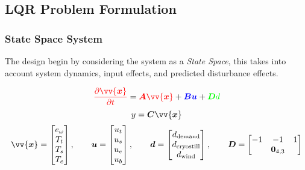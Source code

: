 \subsection{LQR Problem Formulation}
\subsubsection{State Space System}
\label{sec:lqr}

The design begin by considering the system as a \emph{State Space}, this takes into account {\color{red}system dynamics}, {\color{blue}input effects}, and predicted {\color{green}disturbance effects}.

    \begin{equation}
            {\color{red} \frac{ \partial \vv{\bm{x}} }{ \partial t } }  = {\color{red} \bm{A} \vv{\bm{x}}} + {\color{blue}\bm{B}{\bm{u}} }+ {\color{green}\bm{D} d}
    \end{equation}
        \begin{equation}
            y = \bm{C} \vv{\bm{x}}
        \end{equation}
        \begin{equation}
                \vv{\bm{x}} =
                \begin{bmatrix}
                        e_{\omega}\\
                        T_{t}\\
                        T_{s}\\
                        T_{e}\\
                \end{bmatrix}
                ,
                \qquad
                \bm{u} =
                \begin{bmatrix}
                        u_t\\
                        u_s\\
                        u_e\\
                        u_b\\
                \end{bmatrix}
                ,
                \qquad
                \bm{d} =
                \begin{bmatrix}
                        d_{\text{demand}}\\
                        d_{\text{cryostill}}\\
                        d_{\text{wind}}
                \end{bmatrix}
                ,
                \qquad
                \bm{D} =
                \begin{bmatrix}
                        -1 & -1 & 1 \\
                        \, & \bm{0}_{4,3} & \, \\
                \end{bmatrix}
        \end{equation}
